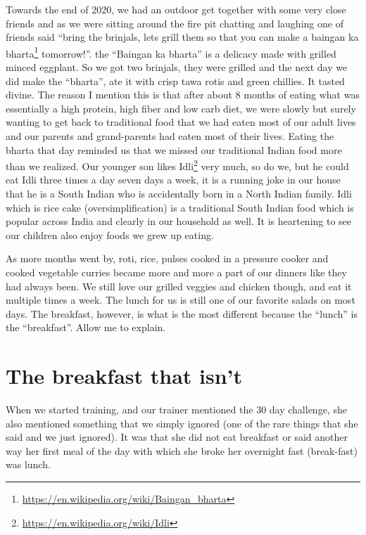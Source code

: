 \documentclass[
  oneside]{book}
\DeclareRobustCommand{\href}[2]{#2\footnote{\url{#1}}}
\begin{document}
Towards the end of 2020, we had an outdoor get together with some very close friends and as we were sitting around the fire pit chatting and laughing one of friends said ``bring the brinjals, lets grill them so that you can make a \href{https://en.wikipedia.org/wiki/Baingan_bharta}{baingan ka bharta} tomorrow!''. the ``Baingan ka bharta'' is a delicacy made with grilled minced eggplant. So we got two brinjals, they were grilled and the next day we did make the ``bharta'', ate it with crisp tawa rotis and green chillies. It tasted divine. The reason I mention this is that after about 8 months of eating what was essentially a high protein, high fiber and low carb diet, we were slowly but surely wanting to get back to traditional food that we had eaten most of our adult lives and our parents and grand-parents had eaten most of their lives. Eating the bharta that day reminded us that we missed our traditional Indian food more than we realized. Our younger son likes \href{https://en.wikipedia.org/wiki/Idli}{Idli} very much, so do we, but he could eat Idli three times a day seven days a week, it is a running joke in our house that he is a South Indian who is accidentally born in a North Indian family. Idli which is rice cake (oversimplification) is a traditional South Indian food which is popular across India and clearly in our household as well. It is heartening to see our children also enjoy foods we grew up eating.

As more months went by, roti, rice, pulses cooked in a pressure cooker and cooked vegetable curries became more and more a part of our dinners like they had always been. We still love our grilled veggies and chicken though, and eat it multiple times a week. The lunch for us is still one of our favorite salads on most days. The breakfast, however, is what is the most different because the ``lunch'' is the ``breakfast''. Allow me to explain.

\hypertarget{the-breakfast-that-isnt}{%
\section{The breakfast that isn't}\label{the-breakfast-that-isnt}}

When we started training, and our trainer mentioned the 30 day challenge, she also mentioned something that we simply ignored (one of the rare things that she said and we just ignored). It was that she did not eat breakfast or said another way her first meal of the day with which she broke her overnight fast (break-fast) was lunch.
\end{document}
